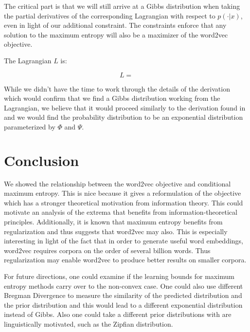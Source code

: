 \documentclass[]{article}
\begin{document}
The critical part is that we will still arrive at a Gibbs distribution when taking the partial derivatives of the corresponding Lagrangian with respect to $p(\cdot|x)$, even in light of our additional constraint. The constraints enforce that any solution to the maximum entropy will also be a maximizer of the word2vec objective.

The Lagrangian $L$ is:

\begin{equation}
	L = 
\end{equation}

While we didn't have the time to work through the details of the derivation which would confirm that we find a Gibbs distribution working from the Lagrangian, we believe that it would proceed similarly to the derivation found in \cite{logregmaxent} and we would find the probability distribution to be an exponential distribution parameterized by $\Phi$ and $\Psi$.

\section{Conclusion}

We showed the relationship between the word2vec objective and conditional maximum entropy. This is nice because it gives a reformulation of the objective which has a stronger theoretical motivation from information theory. This could motivate an analysis of the extrema that benefits from information-theoretical principles. Additionally, it is known that maximum entropy benefits from regularization and thus suggests that word2vec may also. This is especially interesting in light of the fact that in order to generate useful word embeddings, word2vec requires corpora on the order of several billion words. Thus regularization may enable word2vec to produce better results on smaller corpora.

For future directions, one could examine if the learning bounds for maximum entropy methods carry over to the non-convex case. One could also use different Bregman Divergence to measure the similarity of the predicted distribution and the prior distribution and this would lead to a different exponential distribution instead of Gibbs. Also one could take a different prior distributions with are linguistically motivated, such as the Zipfian distribution.
\end{document}
